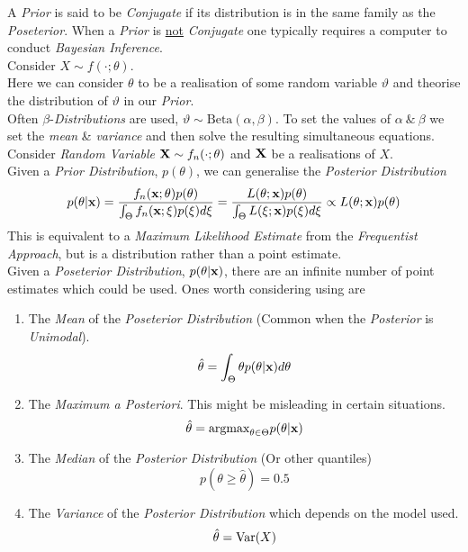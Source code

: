 \documentclass[11pt,a4paper]{article}
\begin{document}
A \textit{Prior} is said to be \textit{Conjugate} if its distribution is in the same family as the \textit{Poseterior}. When a \textit{Prior} is \underline{not} \textit{Conjugate} one typically requires a computer to conduct \textit{Bayesian Inference}.\\

Consider $X\sim f(\cdot;\theta)$.\\
Here we can consider $\theta$ to be a realisation of some random variable $\vartheta$ and theorise the distribution of $\vartheta$ in our \textit{Prior}.\\
\nb Often $\beta$-\textit{Distributions} are used, $\vartheta\sim\text{Beta}(\alpha,\beta)$. To set the values of $\alpha\ \&\ \beta$ we set the \textit{mean} \& \textit{variance} and then solve the resulting simultaneous equations.\\

Consider \textit{Random Variable} $\textbf{X}\sim f_n(\cdot;\theta)$ and $\textbf{X}$ be a realisations of $X$.\\
Given a \textit{Prior Distribution}, $p(\theta)$, we can generalise the \textit{Posterior Distribution}
$$p(\theta|\textbf{x})=\dfrac{f_n(\textbf{x};\theta)p(\theta)}{\int_\Theta f_n(\textbf{x};\xi)p(\xi)d\xi}=\dfrac{L(\theta;\textbf{x})p(\theta)}{\int_\Theta L(\xi;\textbf{x})p(\xi)d\xi}\propto L(\theta;\textbf{x})p(\theta)$$
\nb This is equivalent to a \textit{Maximum Likelihood Estimate} from the \textit{Frequentist Approach}, but is a distribution rather than a point estimate.\\

Given a \textit{Poseterior Distribution}, $p(\theta|\textbf{x})$, there are an infinite number of point estimates which could be used. Ones worth considering using are
\begin{enumerate}
	\item The \textit{Mean} of the \textit{Poseterior Distribution} (Common when the \textit{Posterior} is \textit{Unimodal}).
	$$\hat\theta=\int_\Theta\theta p(\theta|\textbf{x})d\theta$$
	\item The \textit{Maximum a Posteriori}. This might be misleading in certain situations.
	$$\hat\theta=\text{argmax}_{\theta\in\Theta}p(\theta|\textbf{x})$$
	\item The \textit{Median} of the \textit{Posterior Distribution} (Or other quantiles)
	$$p(\theta\geq\hat\theta)=0.5$$
	\item The \textit{Variance} of the \textit{Posterior Distribution} which depends on the model used.
	$$\hat\theta=\mathrm{Var}(X)$$
\end{enumerate}
\end{document}
